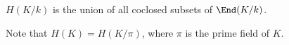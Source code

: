 $H(K/k)$ is the union of all coclosed subsets of $\End(K/k)$.

Note that $H(K) = H(K/\pi)$, where $\pi$ is the prime field of $K$.
